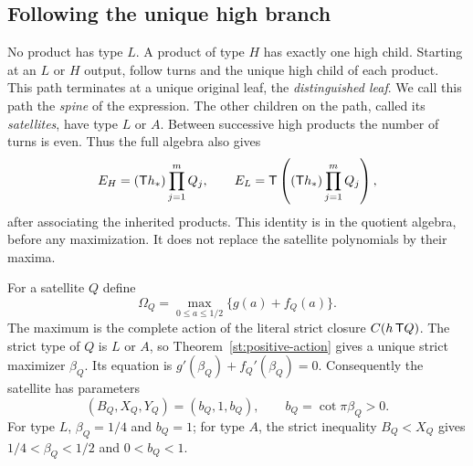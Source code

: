 \subsection{Following the unique high branch}
No product has type $L$. A product of type $H$ has
exactly one high child. Starting at an $L$ or $H$
output, follow turns and the unique high child of
each product. This path terminates at a unique
original leaf, the \emph{distinguished leaf}.
We call this path the \emph{spine} of the expression. The other
children on the path, called its \emph{satellites}, have type $L$ or $A$.
Between successive high products the number of turns
is even. Thus the full algebra also gives
\begin{equation}\label{st:spine-source}
 E_H=(\mathsf T h_*)\prod_{j=1}^m Q_j,\qquad
 E_L=\mathsf T\left((\mathsf T h_*)\prod_{j=1}^m Q_j\right),
\end{equation}
after associating the inherited products. This identity is in the
quotient algebra, before any maximization. It does not replace
the satellite polynomials by their maxima.

For a satellite $Q$ define
\begin{equation}\label{st:Omega}
 \Omega_Q=\max_{0\le a\le1/2}\{g(a)+f_Q(a)\}.
\end{equation}
The maximum is the complete action of the literal
strict closure $C(h\,\mathsf T Q)$. The strict type of
$Q$ is $L$ or $A$, so Theorem~\ref{st:positive-action}
gives a unique strict maximizer $\beta_Q$.
Its equation is
$g'(\beta_Q)+f_Q'(\beta_Q)=0$.
Consequently the satellite has parameters
\begin{equation}\label{st:satellite-parameters}
 (B_Q,X_Q,Y_Q)=(b_Q,1,b_Q),\qquad
 b_Q=\cot\pi\beta_Q>0 .
\end{equation}
For type $L$, $\beta_Q=1/4$ and $b_Q=1$;
for type $A$, the strict inequality $B_Q<X_Q$
gives $1/4<\beta_Q<1/2$ and $0<b_Q<1$.

